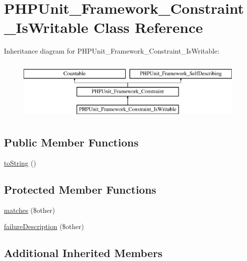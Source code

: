 \hypertarget{class_p_h_p_unit___framework___constraint___is_writable}{}\section{P\+H\+P\+Unit\+\_\+\+Framework\+\_\+\+Constraint\+\_\+\+Is\+Writable Class Reference}
\label{class_p_h_p_unit___framework___constraint___is_writable}
Inheritance diagram for P\+H\+P\+Unit\+\_\+\+Framework\+\_\+\+Constraint\+\_\+\+Is\+Writable\+:\begin{figure}[H]
\begin{center}
\leavevmode
\includegraphics[height=3.000000cm]{class_p_h_p_unit___framework___constraint___is_writable}
\end{center}
\end{figure}
\subsection*{Public Member Functions}
\begin{DoxyCompactItemize}
\item 
\mbox{\hyperlink{class_p_h_p_unit___framework___constraint___is_writable_a5558c5d549f41597377fa1ea8a1cefa3}{to\+String}} ()
\end{DoxyCompactItemize}
\subsection*{Protected Member Functions}
\begin{DoxyCompactItemize}
\item 
\mbox{\hyperlink{class_p_h_p_unit___framework___constraint___is_writable_a9c9c337de483bbdbb9fa249a6c7c9cc5}{matches}} (\$other)
\item 
\mbox{\hyperlink{class_p_h_p_unit___framework___constraint___is_writable_aaabb679273bfb812df4d81c283754a59}{failure\+Description}} (\$other)
\end{DoxyCompactItemize}
\subsection*{Additional Inherited Members}



